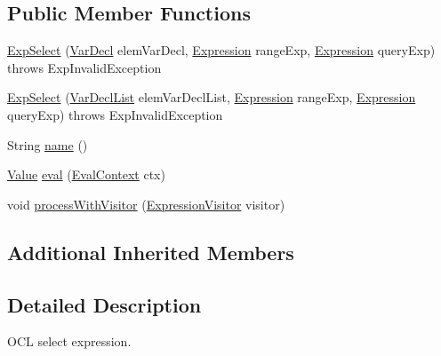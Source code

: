 \subsection*{Public Member Functions}
\begin{DoxyCompactItemize}
\item 
\hyperlink{classorg_1_1tzi_1_1use_1_1uml_1_1ocl_1_1expr_1_1_exp_select_a51dab2b61eaff90931d65f71846e63dc}{Exp\-Select} (\hyperlink{classorg_1_1tzi_1_1use_1_1uml_1_1ocl_1_1expr_1_1_var_decl}{Var\-Decl} elem\-Var\-Decl, \hyperlink{classorg_1_1tzi_1_1use_1_1uml_1_1ocl_1_1expr_1_1_expression}{Expression} range\-Exp, \hyperlink{classorg_1_1tzi_1_1use_1_1uml_1_1ocl_1_1expr_1_1_expression}{Expression} query\-Exp)  throws Exp\-Invalid\-Exception     
\item 
\hyperlink{classorg_1_1tzi_1_1use_1_1uml_1_1ocl_1_1expr_1_1_exp_select_a034ab39dfb0fbde9deef34168b423edd}{Exp\-Select} (\hyperlink{classorg_1_1tzi_1_1use_1_1uml_1_1ocl_1_1expr_1_1_var_decl_list}{Var\-Decl\-List} elem\-Var\-Decl\-List, \hyperlink{classorg_1_1tzi_1_1use_1_1uml_1_1ocl_1_1expr_1_1_expression}{Expression} range\-Exp, \hyperlink{classorg_1_1tzi_1_1use_1_1uml_1_1ocl_1_1expr_1_1_expression}{Expression} query\-Exp)  throws Exp\-Invalid\-Exception     
\item 
String \hyperlink{classorg_1_1tzi_1_1use_1_1uml_1_1ocl_1_1expr_1_1_exp_select_aaa2dd49a5a669d6dd1aa4703b38a0b47}{name} ()
\item 
\hyperlink{classorg_1_1tzi_1_1use_1_1uml_1_1ocl_1_1value_1_1_value}{Value} \hyperlink{classorg_1_1tzi_1_1use_1_1uml_1_1ocl_1_1expr_1_1_exp_select_a28652c6f84ad2eda5988e6837c85d07b}{eval} (\hyperlink{classorg_1_1tzi_1_1use_1_1uml_1_1ocl_1_1expr_1_1_eval_context}{Eval\-Context} ctx)
\item 
void \hyperlink{classorg_1_1tzi_1_1use_1_1uml_1_1ocl_1_1expr_1_1_exp_select_a25d821caf177ef415c1aaf9c3382da16}{process\-With\-Visitor} (\hyperlink{interfaceorg_1_1tzi_1_1use_1_1uml_1_1ocl_1_1expr_1_1_expression_visitor}{Expression\-Visitor} visitor)
\end{DoxyCompactItemize}
\subsection*{Additional Inherited Members}


\subsection{Detailed Description}
O\-C\-L select expression.

